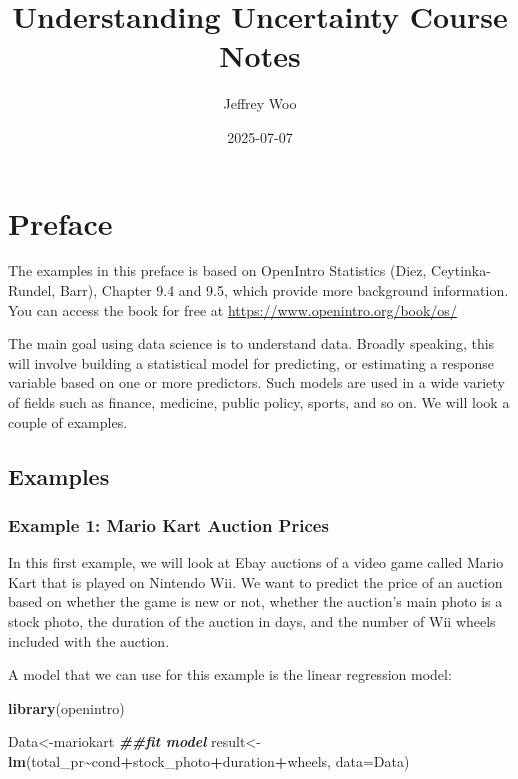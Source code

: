 \documentclass[
]{book}
\title{Understanding Uncertainty Course Notes}
\author{Jeffrey Woo}
\date{2025-07-07}
\newenvironment{Shaded}{\begin{snugshade}}{\end{snugshade}}
\newcommand{\AttributeTok}[1]{\textcolor[rgb]{0.13,0.29,0.53}{#1}}
\newcommand{\DocumentationTok}[1]{\textcolor[rgb]{0.56,0.35,0.01}{\textbf{\textit{#1}}}}
\newcommand{\FunctionTok}[1]{\textcolor[rgb]{0.13,0.29,0.53}{\textbf{#1}}}
\newcommand{\NormalTok}[1]{#1}
\newcommand{\OtherTok}[1]{\textcolor[rgb]{0.56,0.35,0.01}{#1}}
\newcommand{\SpecialCharTok}[1]{\textcolor[rgb]{0.81,0.36,0.00}{\textbf{#1}}}
\begin{document}
\maketitle

{
\setcounter{tocdepth}{1}
\tableofcontents
}
\chapter*{Preface}\label{preface}

The examples in this preface is based on OpenIntro Statistics (Diez, Ceytinka-Rundel, Barr), Chapter 9.4 and 9.5, which provide more background information. You can access the book for free at \url{https://www.openintro.org/book/os/}

The main goal using data science is to understand data. Broadly speaking, this will involve building a statistical model for predicting, or estimating a response variable based on one or more predictors. Such models are used in a wide variety of fields such as finance, medicine, public policy, sports, and so on. We will look a couple of examples.

\section{Examples}\label{examples}

\subsection{Example 1: Mario Kart Auction Prices}\label{example-1-mario-kart-auction-prices}

In this first example, we will look at Ebay auctions of a video game called Mario Kart that is played on Nintendo Wii. We want to predict the price of an auction based on whether the game is new or not, whether the auction's main photo is a stock photo, the duration of the auction in days, and the number of Wii wheels included with the auction.

A model that we can use for this example is the linear regression model:

\begin{Shaded}
\begin{Highlighting}[]
\FunctionTok{library}\NormalTok{(openintro)}

\NormalTok{Data}\OtherTok{\textless{}{-}}\NormalTok{mariokart}
\DocumentationTok{\#\#fit model}
\NormalTok{result}\OtherTok{\textless{}{-}}\FunctionTok{lm}\NormalTok{(total\_pr}\SpecialCharTok{\textasciitilde{}}\NormalTok{cond}\SpecialCharTok{+}\NormalTok{stock\_photo}\SpecialCharTok{+}\NormalTok{duration}\SpecialCharTok{+}\NormalTok{wheels, }\AttributeTok{data=}\NormalTok{Data)}
\end{Highlighting}
\end{Shaded}
\end{document}
